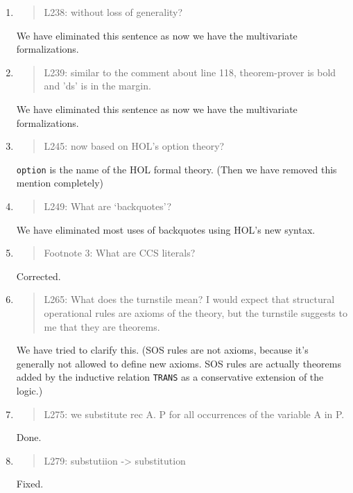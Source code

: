 \begin{enumerate}
\item \begin{quote}
    L238: without loss of generality?
  \end{quote}
  \Mark
  We have eliminated this sentence as now we have  the
  multivariate formalizations.
  
\item \begin{quote}
    L239: similar to the comment about line 118, theorem-prover is
    bold and 'ds' is in the margin.
  \end{quote}
  \Mark
  We have eliminated this sentence as now we have  the
  multivariate formalizations.
  
\item \begin{quote}
    L245: now based on HOL’s option theory?
  \end{quote}
  \Mark
  \texttt{option} is the name of the HOL formal theory. (Then we have
  removed this mention completely)
  
\item \begin{quote}
    L249: What are ‘backquotes’?
  \end{quote}
  \Mark
  We have eliminated most uses of backquotes using HOL's new syntax.
  
\item \begin{quote}
    Footnote 3: What are CCS literals?
  \end{quote}
  \Mark
 Corrected.
  
\item \begin{quote}
    L265: What does the turnstile mean? I would expect that structural
    operational rules are axioms of the theory, but the turnstile
    suggests to me that they are theorems.
  \end{quote}
   \Mark
 We have tried to  clarify this. 
(SOS rules are  not axioms, because it's
  generally not allowed to define new axioms. SOS rules are actually
 theorems added by the inductive relation \texttt{TRANS} as a
  conservative extension of the logic.)
  
\item \begin{quote}
    L275: we substitute rec A. P for all occurrences of the variable A in P.
  \end{quote}
  \Mark
  Done.
  
\item \begin{quote}
    L279: substutiion -> substitution
  \end{quote}
  \Mark
  Fixed.
  

\end{enumerate}
